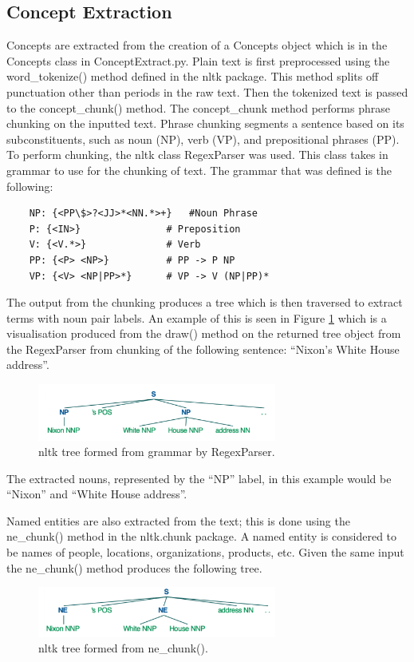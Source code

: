\subsection{Concept Extraction}
\label{subsec:4.1.2}
Concepts are extracted from the creation of a Concepts object which is in the Concepts class in ConceptExtract.py. Plain text is first preprocessed using the word\_tokenize() method defined in the nltk package. This method splits off punctuation other than periods in the raw text. Then the tokenized text is passed to the concept\_chunk() method. The concept\_chunk method performs phrase chunking on the inputted text. Phrase chunking segments a sentence based on its subconstituents, such as noun (NP), verb (VP), and prepositional phrases (PP).  To perform chunking, the nltk class RegexParser was used. This class takes in grammar to use for the chunking of text. The grammar that was defined is the following:

\begin{lstlisting}
    NP: {<PP\$>?<JJ>*<NN.*>+}	#Noun Phrase
    P: {<IN>}				# Preposition
    V: {<V.*>}				# Verb
    PP: {<P> <NP>}			# PP -> P NP
    VP: {<V> <NP|PP>*}		# VP -> V (NP|PP)*
\end{lstlisting}
The output from the chunking produces a tree which is then traversed to extract terms with noun pair labels. An example of this is seen in Figure \ref{tree} which is a visualisation produced from the draw() method on the returned tree object from the RegexParser from chunking of the following sentence: “Nixon’s White House address”.
\begin{figure}[h]
    \centering
         \includegraphics[width=0.70\textwidth]{Figures/tree.png}
          \caption{nltk tree formed from grammar by RegexParser.}
           \label{tree}
\end{figure}

The extracted nouns, represented by the “NP” label, in this example would be “Nixon” and “White House address”.

Named entities are also extracted from the text; this is done using the ne\_chunk() method in the nltk.chunk package. A named entity is considered to be names of people, locations, organizations, products, etc. Given the same input the ne\_chunk() method produces the following tree.
\begin{figure}[h]
    \centering
         \includegraphics[width=0.70\textwidth]{Figures/treeNE.png}
          \caption{nltk tree formed from ne\_chunk().}
           \label{treeNE}
\end{figure}


